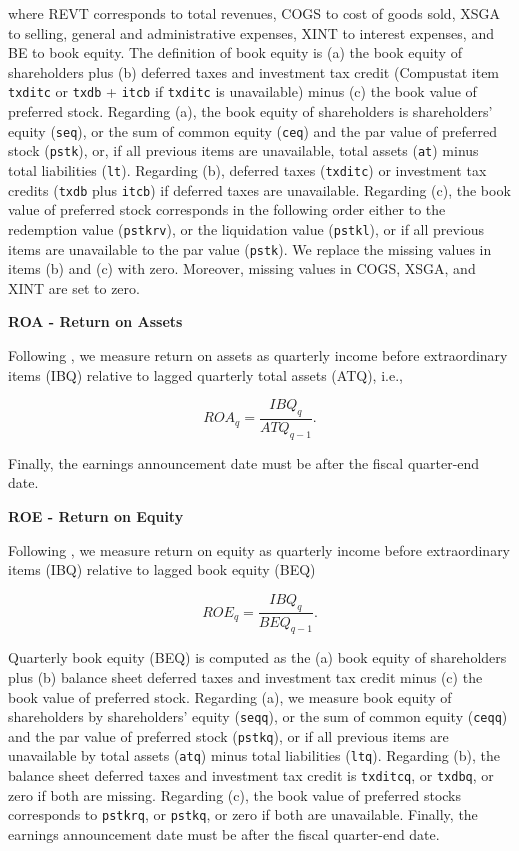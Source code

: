 \documentclass[
  article]{jss}
\begin{document}
where REVT corresponds to total revenues, COGS to cost of goods sold,
XSGA to selling, general and administrative expenses, XINT to interest
expenses, and BE to book equity. The definition of book equity is (a)
the book equity of shareholders plus (b) deferred taxes and investment
tax credit (Compustat item \texttt{txditc} or \texttt{txdb} +
\texttt{itcb} if \texttt{txditc} is unavailable) minus (c) the book
value of preferred stock. Regarding (a), the book equity of shareholders
is shareholders' equity (\texttt{seq}), or the sum of common equity
(\texttt{ceq}) and the par value of preferred stock (\texttt{pstk}), or,
if all previous items are unavailable, total assets (\texttt{at}) minus
total liabilities (\texttt{lt}). Regarding (b), deferred taxes
(\texttt{txditc}) or investment tax credits (\texttt{txdb} plus
\texttt{itcb}) if deferred taxes are unavailable. Regarding (c), the
book value of preferred stock corresponds in the following order either
to the redemption value (\texttt{pstkrv}), or the liquidation value
(\texttt{pstkl}), or if all previous items are unavailable to the par
value (\texttt{pstk}). We replace the missing values in items (b) and
(c) with zero. Moreover, missing values in COGS, XSGA, and XINT are set
to zero.

\textbf{ROA - Return on Assets}

Following \citet{balakrishnan.2010}, we measure return on assets as
quarterly income before extraordinary items (IBQ) relative to lagged
quarterly total assets (ATQ), i.e.,

\[
ROA_{q} = \frac{IBQ_{q}}{ATQ_{q-1}}\text{.}
\]

Finally, the earnings announcement date must be after the fiscal
quarter-end date.

\textbf{ROE - Return on Equity}

Following \citet{hou.2014}, we measure return on equity as quarterly
income before extraordinary items (IBQ) relative to lagged book equity
(BEQ)

\[
ROE_{q} = \frac{IBQ_{q}}{BEQ_{q-1}}\text{.}
\]

Quarterly book equity (BEQ) is computed as the (a) book equity of
shareholders plus (b) balance sheet deferred taxes and investment tax
credit minus (c) the book value of preferred stock. Regarding (a), we
measure book equity of shareholders by shareholders' equity
(\texttt{seqq}), or the sum of common equity (\texttt{ceqq}) and the par
value of preferred stock (\texttt{pstkq}), or if all previous items are
unavailable by total assets (\texttt{atq}) minus total liabilities
(\texttt{ltq}). Regarding (b), the balance sheet deferred taxes and
investment tax credit is \texttt{txditcq}, or \texttt{txdbq}, or zero if
both are missing. Regarding (c), the book value of preferred stocks
corresponds to \texttt{pstkrq}, or \texttt{pstkq}, or zero if both are
unavailable. Finally, the earnings announcement date must be after the
fiscal quarter-end date.
\end{document}
